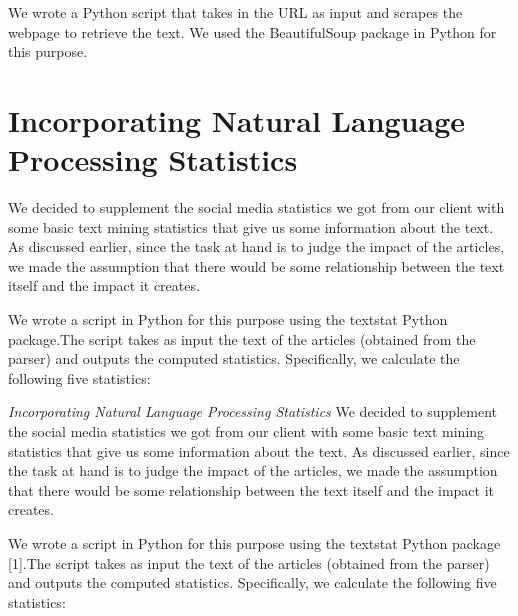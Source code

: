 \documentclass[10pt,letterpaper]{article}
\begin{document}
We wrote a Python script that takes in the URL as input and scrapes the
webpage to retrieve the text. We used the BeautifulSoup package in
Python for this purpose.


\section{Incorporating Natural Language Processing
Statistics}\label{incorporating-natural-language-processing-statistics}

We decided to supplement the social media statistics we got from our
client with some basic text mining statistics that give us some
information about the text. As discussed earlier, since the task at hand
is to judge the impact of the articles, we made the assumption that
there would be some relationship between the text itself and the impact
it creates.

We wrote a script in Python for this purpose using the textstat Python
package.The script takes as input the text of the articles (obtained
from the parser) and outputs the computed statistics. Specifically, we
calculate the following five statistics:

\emph{Incorporating Natural Language Processing Statistics} We decided
to supplement the social media statistics we got from our client with
some basic text mining statistics that give us some information about
the text. As discussed earlier, since the task at hand is to judge the
impact of the articles, we made the assumption that there would be some
relationship between the text itself and the impact it creates.

We wrote a script in Python for this purpose using the textstat Python
package {[}1{]}.The script takes as input the text of the articles
(obtained from the parser) and outputs the computed statistics.
Specifically, we calculate the following five statistics:
\end{document}
